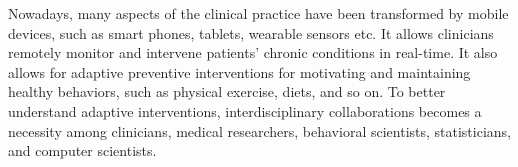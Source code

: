 \documentclass{article}
\begin{document}
Nowadays, many aspects of the clinical practice have been transformed by mobile devices, such as smart phones, tablets, wearable sensors etc. It allows clinicians remotely monitor and intervene patients’ chronic conditions in real-time. It also allows for adaptive preventive interventions for motivating and maintaining healthy behaviors, such as physical exercise, diets, and so on. To better understand adaptive interventions, interdisciplinary collaborations becomes a necessity among clinicians, medical researchers, behavioral scientists, statisticians, and computer scientists.\\



\end{document}
